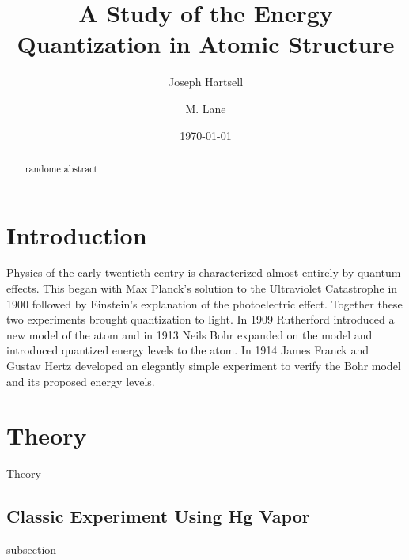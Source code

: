 \documentclass[aps,twocolumn,secnumarabic,balancelastpage,amsmath,amssymb,nofootinbib]{revtex4}
\begin{document}
\title{A Study of the Energy Quantization in Atomic Structure}
\author{Joseph Hartsell}
\author{M. Lane}
\date{\today}

\begin{abstract}
	randome abstract
\end{abstract}

\maketitle

\section{Introduction}

Physics of the early twentieth centry is characterized almost entirely by quantum effects. This began with Max Planck's solution to the Ultraviolet Catastrophe in 1900 followed by Einstein's explanation of the photoelectric effect. Together these two experiments brought quantization to light. In 1909 Rutherford introduced a new model of the atom and in 1913 Neils Bohr expanded on the model and introduced quantized energy levels to the atom.
In 1914 James Franck and Gustav Hertz developed an elegantly simple experiment to verify the Bohr model and its proposed energy levels.

\section{Theory}

Theory

\subsection{Classic Experiment Using Hg Vapor}

subsection
\end{document}
